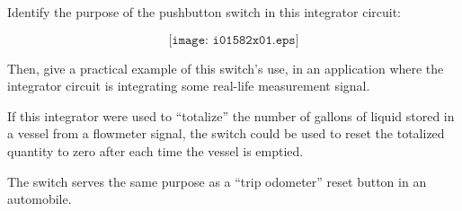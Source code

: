 

Identify the purpose of the pushbutton switch in this integrator circuit:

$$\texttt{[image: i01582x01.eps]}$$

Then, give a practical example of this switch's use, in an application where the integrator circuit is integrating some real-life measurement signal. 







If this integrator were used to ``totalize'' the number of gallons of liquid stored in a vessel from a flowmeter signal, the switch could be used to reset the totalized quantity to zero after each time the vessel is emptied.







The switch serves the same purpose as a ``trip odometer'' reset button in an automobile.





